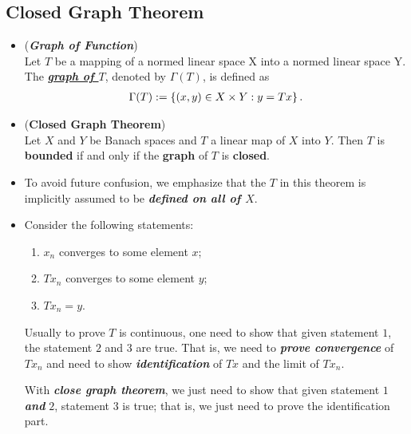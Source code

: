 \documentclass[11pt]{article}
\begin{document}
\subsection{Closed Graph Theorem}
\begin{itemize}
\item \begin{definition} (\emph{\textbf{Graph of Function}})\\
Let $Τ$ be a mapping of a normed linear space X into a normed  linear space Y. The \underline{\emph{\textbf{graph of $T$}}}, denoted by $\Gamma(T)$, is defined as 
\begin{align*}
\Gamma(T) := \left\{(x,y) \in X \times Y: y = Tx\right\}.
\end{align*}
\end{definition}


\item \begin{theorem} (\textbf{Closed Graph Theorem})\citep{reed1980methods} \\
Let $X$ and $Y$ be Banach spaces  and $T$ a linear map of $X$ into $Y$. Then $T$ is \textbf{bounded} if and only if the \textbf{graph} of 
$Τ$ is \textbf{closed}. 
\end{theorem}

\item \begin{remark}
To avoid future confusion, we emphasize that the $T$ in this theorem is implicitly assumed to be \emph{\textbf{defined on all of $X$}}. 
\end{remark}

\item \begin{remark}
Consider the following statements: 
\begin{enumerate}
\item $x_n$ converges to some element $x$;
\item $T x_n$ converges to some element $y$; 
\item $T x_n = y$.
\end{enumerate} 
Usually to prove $T$ is continuous, one need to show that given statement $1$, the statement $2$ and $3$ are true. That is, we need to \emph{\textbf{prove convergence}} of $T x_n$ and need to show \emph{\textbf{identification}} of $T x$ and the limit of $T x_n$.

With \emph{\textbf{close graph theorem}}, we just need to show that given statement $1$ \emph{\textbf{and}} $2$, statement $3$ is true; that is, we just need to prove the identification part.
\end{remark}


\end{itemize}
\end{document}

